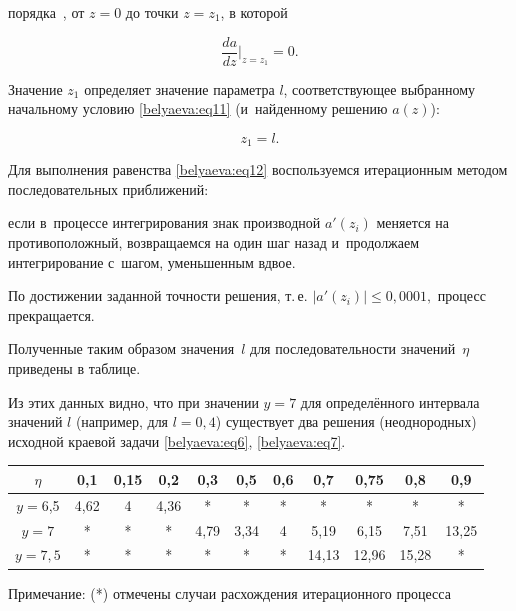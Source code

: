 порядка~\cite{Chisl}, от $z=0$ до точки ${z=z}_1$, в которой

\[

\frac{da}{dz} \Big|_{z=z_1} =0.

\]

Значение $z_1$ определяет значение параметра $l$, соответствующее выбранному начальному условию \eqref{belyaeva:eq11} (и~найденному решению $a(z)$):

\begin{equation}

\label{belyaeva:eq12} z_1=l.

\end{equation}

Для выполнения равенства \eqref{belyaeva:eq12} воспользуемся итерационным методом последовательных приближений: 

если в~процессе интегрирования знак производной $a'(z_i)$ меняется на противоположный, возвращаемся на один шаг назад и~продолжаем интегрирование с~шагом, уменьшенным вдвое. 

По достижении заданной точности решения, т.\,е. $|a'(z_i)|\leq 0,0001,$ процесс прекращается. 

Полученные таким образом значения~$l$ для последовательности значений~$\eta$ приведены в таблице. 

Из этих данных видно, что при значении $y=7$ для определённого интервала  значений $l$ (например, для $l=0,4$) существует два решения (неоднородных) исходной краевой задачи \eqref{belyaeva:eq6}, \eqref{belyaeva:eq7}.



\begin{table}[h!]\small \centering

\begin{tabular}{c|c|c|c|c|c|c|c|c|c|c}

\hline

$\eta $ & 0{,}1   & 0{,}15 & 0{,}2   & 0{,}3 & 0{,}5 & 0{,}6 & 0{,}7 & 0{,}75 & 0{,}8 & 0{,}9 \\ \hline

\rule{0mm}{12pt}%

$y=6${,}5   & 4{,}62  & 4    & 4{,}36  &   * &   * &  *  &   * &   *  &    *&  * \\ 

$y=7$ & *     &    * &    *  &4{,}79 & 3{,}34&   4 &5{,}19 &6{,}15  &7{,}51 & 13{,}25 \\ 

$y=7,5$& *     &    * &    *  &   * &   * &  *  &14{,}13&12{,}96 &15{,}28& * \\

 \hline

\end{tabular}

{\par \footnotesize Примечание: (*) отмечены случаи расхождения итерационного процесса}



\vspace{-5mm}

\end{table}



